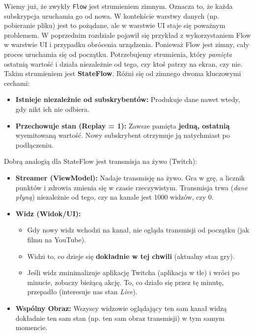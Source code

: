 Wiemy już, że zwykły \texttt{Flow} jest strumieniem zimnym. Oznacza to, że każda subskrypcja uruchamia go od nowa. W kontekście warstwy danych (np. pobieranie pliku) jest to pożądane, ale w warstwie UI staje się poważnym problemem. W poprzednim rozdziale pojawił się przykład z wykorzystaniem Flow w warstwie UI i przypadku obrócenia urządzenia. Ponieważ Flow jest zimny, cały proces uruchamia się od początku. Potrzebujemy strumienia, który \textit{pamięta} ostatnią wartość i działa niezależnie od tego, czy ktoś patrzy na ekran, czy nie. Takim strumieniem jest \textbf{StateFlow}. Różni się od zimnego dwoma kluczowymi cechami:
\begin{itemize}
    \item \textbf{Istnieje niezależnie od subskrybentów:} Produkuje dane nawet wtedy, gdy nikt ich nie odbiera.
    \item \textbf{Przechowuje stan (Replay = 1):} Zawsze pamięta \textbf{jedną, ostatnią} wyemitowaną wartość. Nowy subskrybent otrzymuje ją natychmiast po podłączeniu.
\end{itemize}

Dobrą analogią dla StateFlow jest transmisja na żywo (Twitch):

\begin{itemize}
    \item \textbf{Streamer (ViewModel):} Nadaje transmisję na żywo. Gra w grę, a licznik punktów i zdrowia zmienia się w czasie rzeczywistym. Transmisja trwa (\textit{dane płyną}) niezależnie od tego, czy na kanale jest 1000 widzów, czy 0.
    
    \item \textbf{Widz (Widok/UI):}
    \begin{itemize}
        \item Gdy nowy widz wchodzi na kanał, nie ogląda transmisji od początku (jak filmu na YouTube).
        \item Widzi to, co dzieje się \textbf{dokładnie w tej chwili} (aktualny stan gry).
        \item Jeśli widz zminimalizuje aplikację Twitcha (aplikacja w tle) i wróci po minucie, zobaczy bieżącą akcję. To, co działo się przez tę minutę, przepadło (interesuje nas stan \textit{Live}).
    \end{itemize}
    
    \item \textbf{Wspólny Obraz:} Wszyscy widzowie oglądający ten sam kanał widzą dokładnie ten sam stan (np. ten sam obraz transmisji) w tym samym momencie.
\end{itemize}


